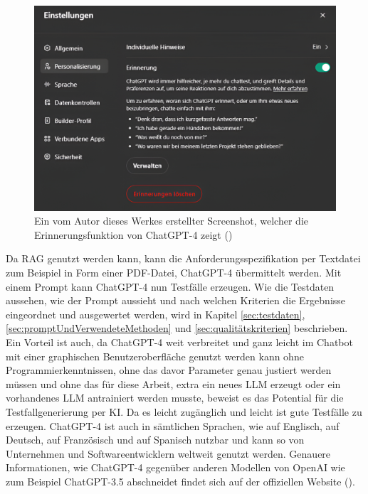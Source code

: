 \documentclass[12pt,toc=bib,toc=listof]{scrreprt}
\begin{document}
\begin{figure}[H]
    \centering
    \includegraphics[width=1\linewidth]{./Bilder/OpenAI_Erinnerungsfunktion ChatGPT-4.png}
    \caption{Ein vom Autor dieses Werkes erstellter Screenshot, welcher die Erinnerungsfunktion von ChatGPT-4 zeigt (\cite{OpenAI2025})}
    \label{fig:enter-label}
\end{figure}
\noindent Da RAG genutzt werden kann, kann die Anforderungsspezifikation per Textdatei zum Beispiel in Form einer PDF-Datei, ChatGPT-4 übermittelt werden. Mit einem Prompt kann ChatGPT-4 nun Testfälle erzeugen. Wie die Testdaten aussehen, wie der Prompt aussieht und nach welchen Kriterien die Ergebnisse eingeordnet und ausgewertet werden, wird in Kapitel \ref{sec:testdaten}, \ref{sec:promptUndVerwendeteMethoden} und \ref{sec:qualitätskriterien} beschrieben. Ein Vorteil ist auch, da ChatGPT-4 weit verbreitet und ganz leicht im Chatbot mit einer graphischen Benutzeroberfläche genutzt werden kann ohne Programmierkenntnissen, ohne das davor Parameter genau justiert werden müssen und ohne das für diese Arbeit, extra ein neues LLM erzeugt oder ein vorhandenes LLM antrainiert werden musste, beweist es das Potential für die Testfallgenerierung per KI. Da es leicht zugänglich und leicht ist gute Testfälle zu erzeugen. ChatGPT-4 ist auch in sämtlichen Sprachen, wie auf Englisch, auf Deutsch, auf Französisch und auf Spanisch nutzbar und kann so von Unternehmen und Softwareentwicklern weltweit genutzt werden. Genauere Informationen, wie ChatGPT-4 gegenüber anderen Modellen von OpenAI wie zum Beispiel ChatGPT-3.5 abschneidet findet sich auf der offiziellen Website (\cite{OpenAI2025}). 
\end{document}
